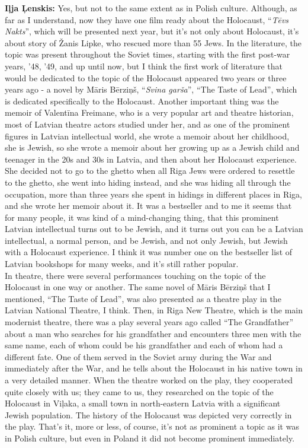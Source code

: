 \textbf{Iļja Ļenskis:} Yes, but not to the same extent as in Polish culture. Although, as far as I understand, now they have one film ready about the Holocaust, ``\textit{Tēvs Nakts}'', which will be presented next year, but it’s not only about Holocaust, it’s about story of Žanis Lipke, who rescued more than 55 Jews. In the literature, the topic was present throughout the Soviet times, starting with the first post-war years, '48, '49, and up until now, but I think the first work of literature that would be dedicated to the topic of the Holocaust appeared two years or three years ago - a novel by Māris Bērziņš, “\textit{Svina garša}”, ``The Taste of Lead'', which is dedicated specifically to the Holocaust. Another important thing was the memoir of Valentīna Freimane, who is a very popular art and theatre historian, most of Latvian theatre actors studied under her, and as one of the prominent figures in Latvian intellectual world, she wrote a memoir about her childhood, she is Jewish, so she wrote a memoir about her growing up as a Jewish child and teenager in the 20s and 30s in Latvia, and then about her Holocaust experience. She decided not to go to the ghetto when all Riga Jews were ordered to resettle to the ghetto, she went into hiding instead, and she was hiding all through the occupation, more than three years she spent in hidings in different places in Riga, and she wrote her memoir about it. It was a bestseller and to me it seems that for many people, it was kind of a mind-changing thing, that this prominent Latvian intellectual turns out to be Jewish, and it turns out you can be a Latvian intellectual, a normal person, and be Jewish, and not only Jewish, but Jewish with a Holocaust experience. I think it was number one on the bestseller list of Latvian bookshops for many weeks, and it’s still rather popular. \\
In theatre, there were several performances touching on the topic of the Holocaust in one way or another. The same novel of Māris Bērziņš that I mentioned, “The Taste of Lead”, was also presented as a theatre play in the Latvian National Theatre, I think. Then, in Riga New Theatre, which is the main modernist theatre, there was a play several years ago called “The Grandfather” about a man who searches for his grandfather and encounters three men with the same name, each of whom could be his grandfather and each of whom had a different fate. One of them served in the Soviet army during the War and immediately after the War, and he tells about the Holocaust in his native town in a very detailed manner. When the theatre worked on the play, they cooperated quite closely with us; they came to us, they researched on the topic of the Holocaust in Viļaka, a small town in north-eastern Latvia with a significant Jewish population. The history of the Holocaust was depicted very correctly in the play. That’s it, more or less, of course, it’s not as prominent a topic as it was in Polish culture, but even in Poland it did not become prominent immediately.

